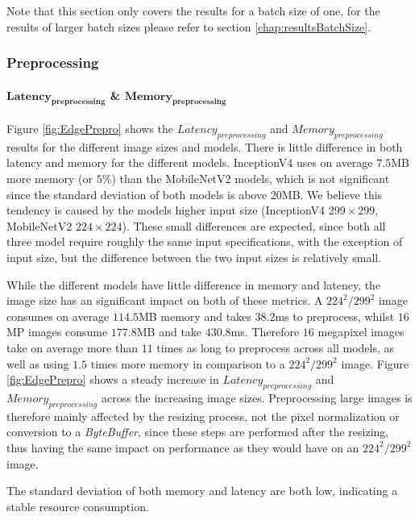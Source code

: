 Note that this section only covers the results for a batch size of one, for the results of larger batch sizes please refer to section \ref{chap:resultsBatchSize}.

\FloatBarrier
\subsubsection{Preprocessing}
\label{chap:edgePrepro}

\paragraph{$\mathbf{Latency_{preprocessing}}$ \& $\mathbf{Memory_{preprocessing}}$}
Figure \ref{fig:EdgePrepro} shows the $Latency_{preprocessing}$ and $Memory_{preprocessing}$ results for the different image sizes and models.
There is little difference in both latency and memory for the different models. 
InceptionV4 uses on average $7.5$MB more memory (or $5\%$) than the MobileNetV2 models, which is not significant since the standard deviation of both models is above $20$MB.
We believe this tendency is caused by the models higher input size (InceptionV4 $299\times299$, MobileNetV2 $224\times224$). 
These small differences are expected, since both all three model require roughly the same input specifications, with the exception of input size, but the difference between the two input sizes is relatively small.

While the different models have little difference in memory and latency, the image size has an significant impact on both of these metrics.
A $224^2/299^2$ image consumes on average $114.5$MB memory and takes $38.2$ms to preprocess, whilst  $16$MP images consume $177.8$MB and take $430.8$ms.
Therefore $16$ megapixel images take on average  more than $11$ times as long to preprocess across all models, as well as using $1.5$ times more memory in comparison to a $224^2/299^2$ image.
Figure \ref{fig:EdgePrepro} shows a steady increase in $Latency_{preprocessing}$ and $Memory_{preprocessing}$ across the increasing image sizes.
Preprocessing large images is therefore mainly affected by the resizing process, not the pixel normalization or conversion to a \emph{ByteBuffer}, since these steps are performed after the resizing, thus having the same impact on performance as they would have on an $224^2/299^2$ image.

The standard deviation of both memory and latency are both low, indicating a stable resource consumption.


